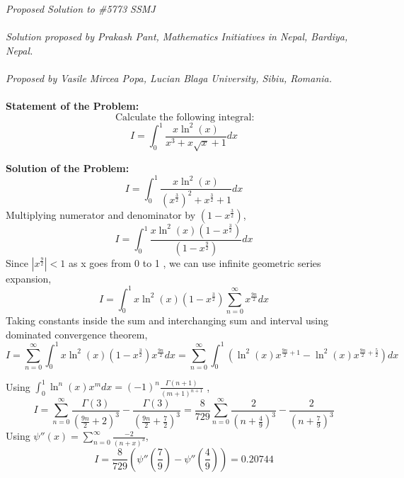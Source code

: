 \documentclass[12pt]{article}
\begin{document}
\textit{Proposed Solution to \#5773 SSMJ }\\ \\
\textit{Solution proposed by Prakash Pant, Mathematics Initiatives in Nepal, Bardiya, Nepal.}\\ \\
\textit{Proposed by Vasile Mircea Popa, Lucian Blaga University, Sibiu, Romania.} \\ \\
\textbf{Statement of the Problem:}
\[ \text{ Calculate the following integral} : \]
\[ I = \int_0^{1}  \frac{x \ln^2(x)}{x^3+x\sqrt{x}+1} dx\]

\textbf{Solution of the Problem:}
\[ I = \int_0^{1}  \frac{x \ln^2(x)}{(x^{\frac{3}{2}})^2+x^{\frac{3}{2}}+1} dx \]
Multiplying numerator and denominator by $(1-x^{\frac{3}{2}})$,
 \[ I = \int_0^{1}  \frac{x \ln^2(x)(1-x^{\frac{3}{2}})}{(1-x^{\frac{9}{2}})}  dx \]
Since $|x^{\frac{9}{2}}|<1 $ as x goes from 0 to 1 , we can use infinite geometric series expansion, 
 \[ I = \int_0^{1} x \ln^2(x)(1-x^{\frac{3}{2}})\sum_{n=0}^{\infty} x^{\frac{9n}{2}}  dx \]
Taking constants inside the sum and interchanging sum and interval using dominated convergence theorem,
 \[ I = \sum_{n=0}^{\infty} \int_0^{1}  x \ln^2(x)(1-x^{\frac{3}{2}}) x^{\frac{9n}{2}}  dx = \sum_{n=0}^{\infty}   \int_0^{1}  \left( \ln^2(x) x^{\frac{9n}{2}+1} - \ln^2(x)x^{\frac{9n}{2}+\frac{5}{2}} \right)  dx\]

 Using $\int_0^1 \ln^n(x)x^m dx = (-1)^n \frac{\Gamma(n+1)}{(m+1)^{n+1}}$ ,
 \[ I = \sum_{n=0}^{\infty} \frac{\Gamma(3)}{(\frac{9n}{2}+2)^3} - \frac{\Gamma(3)}{(\frac{9n}{2}+\frac{7}{2})^3} = \frac{8}{729} \sum_{n=0}^{\infty} \frac{2}{(n+\frac{4}{9})^3} - \frac{2}{(n+\frac{7}{9})^3} \] 
 Using $\psi''(x)= \sum_{n=0}^{\infty} \frac{-2}{(n+x)^3} $,
 \[ I  = \frac{8}{729} \left( \psi''(\frac{7}{9})- \psi''(\frac{4}{9}) \right) = 0.20744 \]  
\end{document}
